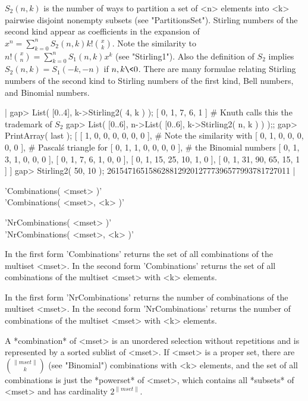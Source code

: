 $S_2(n,k)$ is the number of ways to partition a set of <n>  elements into
<k> pairwise disjoint nonempty  subsets  (see "PartitionsSet").  Stirling
numbers of the second kind  appear as  coefficients  in the  expansion of
$x^n = \sum_{k=0}^{n}{S_2(n,k) k!  {x  \choose k}}$.  Note the similarity
to $n! {x \choose  n} = \sum_{k=0}^{n}{S_1(n,k) x^k}$ (see  "Stirling1").
Also the definition of $S_2$ implies $S_2(n,k) = S_1(-k,-n)$ if $n,k\<0$.
There are many formulae relating  Stirling numbers of  the second kind to
Stirling numbers of the first kind, Bell numbers, and Binomial numbers.

|    gap> List( [0..4], k->Stirling2( 4, k ) );
    [ 0, 1, 7, 6, 1 ]    # Knuth calls this the trademark of $S_2$
    gap> List( [0..6], n->List( [0..6], k->Stirling2( n, k ) ) );;
    gap> PrintArray( last );
    [ [   1,   0,   0,   0,   0,   0,   0 ],    # Note the similarity with
      [   0,   1,   0,   0,   0,   0,   0 ],    # Pascal\'s triangle for
      [   0,   1,   1,   0,   0,   0,   0 ],    # the Binomial numbers
      [   0,   1,   3,   1,   0,   0,   0 ],
      [   0,   1,   7,   6,   1,   0,   0 ],
      [   0,   1,  15,  25,  10,   1,   0 ],
      [   0,   1,  31,  90,  65,  15,   1 ] ]
    gap> Stirling2( 50, 10 );
    26154716515862881292012777396577993781727011 |

%

'Combinations( <mset> )' \\
'Combinations( <mset>, <k> )'

'NrCombinations( <mset> )' \\
'NrCombinations( <mset>, <k> )'

In the  first form 'Combinations' returns the  set of all combinations of
the multiset  <mset>.  In the  second form 'Combinations' returns the set
of all combinations of the multiset <mset> with <k> elements.

In the first form 'NrCombinations'  returns the number of combinations of
the multiset  <mset>.   In the  second form  'NrCombinations' returns the
number of combinations of the multiset <mset> with <k> elements.

A *combination* of  <mset> is an  unordered selection without repetitions
and is represented by a sorted sublist of <mset>.   If <mset> is a proper
set, there  are  ${\|mset\| \choose  k}$  (see  "Binomial")  combinations
with <k> elements, and the set of all combinations is just the *powerset*
of <mset>, which contains all   *subsets* of <mset>  and has  cardinality
$2^{\|mset\|}$.

